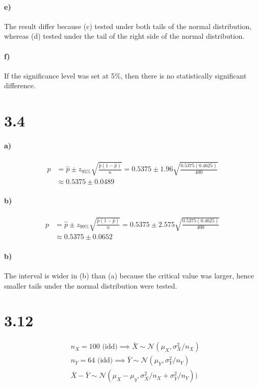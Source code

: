 \documentclass[letterpaper,12pt,titlepage,oneside,final]{book}
\begin{document}
\paragraph{e)}
The result differ because (c) tested under both tails of the normal distribution, whereas (d) tested under the tail of the right side of the normal distribution.
\paragraph{f)} If the significance level was set at 5\%, then there is no statistically significant difference. 

\section*{3.4}
\paragraph{a)}
\begin{align*}
p& = \hat{p}\pm z_{95\%}\sqrt{\frac{\hat{p}(1-\hat{p})}{n}} = 0.5375\pm 1.96\sqrt{\frac{0.5375(0.4625)}{400}}\\
&\approx 0.5375 \pm 0.0489
\end{align*}
\paragraph{b)}
\begin{align*}
p& = \hat{p}\pm z_{99\%}\sqrt{\frac{\hat{p}(1-\hat{p})}{n}} = 0.5375\pm 2.575\sqrt{\frac{0.5375(0.4625)}{400}}\\
&\approx 0.5375 \pm 0.0652
\end{align*}
\paragraph{b)}
The interval is wider in (b) than (a) because the critical value was larger, hence smaller tails under the normal distribution were tested.
\section*{3.12}
\begin{align*}
&n_X = 100\text{ (idd)} \implies \bar{X}\sim \mathcal{N}(\mu_X, \sigma^2_{X}/n_X)\\
&n_Y = 64\text{ (idd)} \implies \bar{Y}\sim \mathcal{N}(\mu_Y, \sigma^2_{Y}/n_Y)\\
&\bar{X} - \bar{Y} \sim \mathcal{N}(\mu_X-\mu_y,\sigma^2_{X}/n_X +\sigma^2_{Y}/n_Y))
\end{align*}
\end{document}
